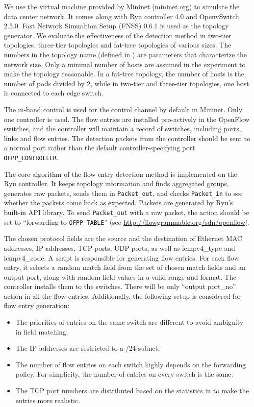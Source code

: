 \documentclass[conference]{IEEEtran}
\begin{document}
We use the virtual machine provided by Mininet (\url{mininet.org}) to simulate the data center network. It comes along with Ryu controller 4.0 and OpenvSwitch 2.5.0. Fast Network Simualtion Setup (FNSS) 0.6.1 is used as the topology generator. We evaluate the effectiveness of the detection method in two-tier topologies, three-tier topologies and fat-tree topologies of various sizes. The numbers in the topology name (defined in \cite{FNSS}) are parameters that characterize the network size. Only a minimal number of hosts are assumed in the experiment to make the topology reasonable. In a fat-tree topology, the number of hosts is the number of pods divided by 2, while in two-tier and three-tier topologies, one host is connected to each edge switch.

The in-band control is used for the control channel by default in Mininet. Only one controller is used. The flow entries are installed pro-actively in the OpenFlow switches, and the controller will maintain a record of switches, including ports, links and flow entries. The detection packets from the controller should be sent to a normal port rather than the default controller-specifying port \texttt{OFPP\_CONTROLLER}.

The core algorithm of the flow entry detection method is implemented on the Ryu controller. It keeps topology information and finds aggregated groups, generates raw packets, sends them in \texttt{Packet\_out}, and checks \texttt{Packet\_in} to see whether the packets come back as expected. Packets are generated by Ryu's built-in API library. To send \texttt{Packet\_out} with a raw packet, the action should be set to ``forwarding to \texttt{OFPP\_TABLE}'' (see \url{http://flowgrammable.org/sdn/openflow}).

The chosen protocol fields are the source and the destination of Ethernet MAC addresses, IP addresses, TCP ports, UDP ports, as well as icmpv4\_type and icmpv4\_code. A script is responsible for generating flow entries. For each flow entry, it selects a random match field from the set of chosen match fields and an output port, along with random field values in a valid range and format. The controller installs them to the switches. There will be only ``output port\_no'' action in all the flow entries. Additionally, the following setup is considered for flow entry generation:

\begin{itemize}
\item
The priorities of entries on the same switch are different to avoid ambiguity in field matching.
\item
The IP addresses are restricted to a /24 subnet.
\item
The number of flow entries on each switch highly depends on the forwarding policy. For simplicity, the number of entries on every switch is the same. 
\item
The TCP port numbers are distributed based on the statistics in \cite{BREAKDOWN} to make the entries more realistic.
\end{itemize}
\end{document}
